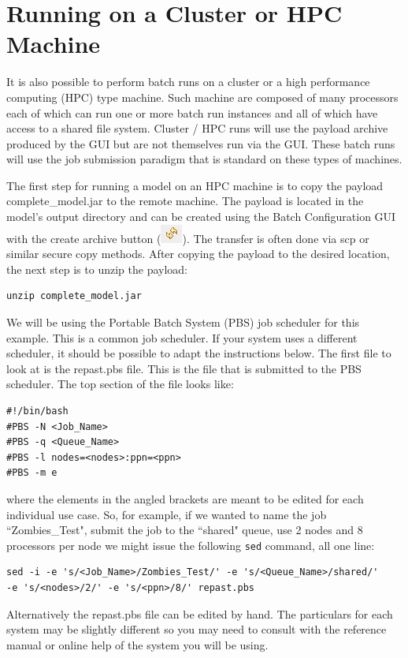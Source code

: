 \documentclass[11pt]{amsart}
\begin{document}
\section{Running on a Cluster or HPC Machine}
\label{sec:hpc}

It is also possible to perform batch runs on a cluster or a high performance computing (HPC) type machine. Such machine are composed of many processors each of which can run one or more batch run instances and all of which have access to a shared file system. Cluster / HPC runs will use the payload archive produced by the GUI  but are not themselves run via the GUI. These batch runs will use the job submission paradigm that is standard on these types of machines.

The first step for running a model on an HPC machine is to copy the payload complete\_model.jar to the remote machine. The payload is located in the model's output directory and can be created using the Batch Configuration GUI with the create archive button (\includegraphics[height=.2in]{images/create_archive_button.png}). The transfer is often done via scp or similar secure copy methods. After copying the payload to the desired location, the next step is to unzip the payload:

\begin{verbatim}
unzip complete_model.jar
\end{verbatim}

We will be using the Portable Batch System (PBS) job scheduler for this example. This is a common job scheduler. If your system uses a different scheduler, it should be possible to adapt the instructions below. The first file to look at is the repast.pbs file. This is the file that is submitted to the PBS scheduler. The top section of the file looks like:
\begin{verbatim}
#!/bin/bash
#PBS -N <Job_Name>
#PBS -q <Queue_Name>
#PBS -l nodes=<nodes>:ppn=<ppn>
#PBS -m e
\end{verbatim}

\noindent where the elements in the angled brackets are meant to be edited for each individual use case. So, for example, if we wanted to name the job ``Zombies\_Test", submit the job to the ``shared" queue,  use 2 nodes and 8 processors per node we might issue the following \texttt{sed} command, all one line:
\begin{verbatim}
sed -i -e 's/<Job_Name>/Zombies_Test/' -e 's/<Queue_Name>/shared/'
-e 's/<nodes>/2/' -e 's/<ppn>/8/' repast.pbs
\end{verbatim}
Alternatively the repast.pbs file can be edited by hand. The particulars for each system may be slightly different so you may need to consult with the reference manual or online help of the system you will be using.
\end{document}
